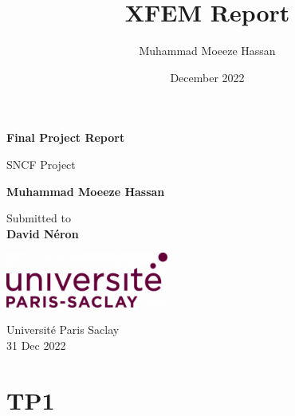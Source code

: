 \documentclass[11pt]{report}
\title{XFEM Report}
\author{Muhammad Moeeze Hassan}
\date{December 2022}
\begin{document}
\dominitoc

\begin{titlepage}
    \begin{center}
        \vspace*{1cm}
            
        \Huge
        \textbf{Final Project Report}
            
        \vspace{0.5cm}
        \LARGE
        SNCF Project
            
        \vspace{1.5cm}
            
        \textbf{Muhammad Moeeze Hassan}
            
        \vfill
            
        Submitted to\\
        \textbf{David Néron}
            
        \vspace{0.8cm}
            
        \includegraphics[width=0.4\textwidth]{assets/logo.png}
            
        \Large
        Université Paris Saclay\\
        31 Dec 2022
            
    \end{center}
\end{titlepage}


\tableofcontents
\adjustmtc
\newpage
\listoffigures
\newpage


\chapter{TP1}
\minitoc
\pagebreak
\label{Chap: TP 1}




\printbibliography
\end{document}
